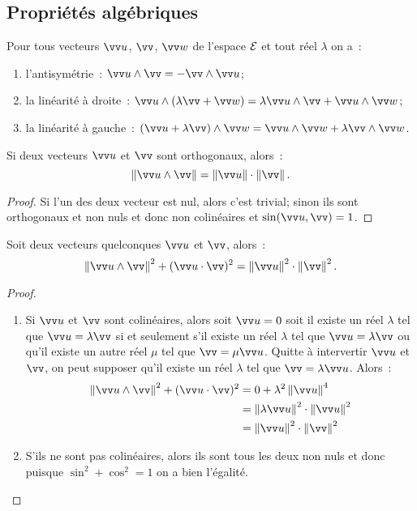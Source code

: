\subsection{Propriétés algébriques}
\begin{prop}
  Pour tous vecteurs $\vu$, $\vv$, $\vw$ de l'espace $\mathcal{E}$ et tout réel $\lambda$ on a~:
  \begin{enumerate}
  \item l'antisymétrie~: $\vu\wedge\vv=-\vv\wedge\vu$;
  \item la linéarité à droite~: $\vu\wedge(\lambda\vv+\vw)=\lambda\vu\wedge\vv+\vu\wedge\vw$;
  \item la linéarité à gauche~: $(\vu+\lambda\vv)\wedge\vw=\vu\wedge\vw+\lambda\vv\wedge\vw$.
  \end{enumerate}
\end{prop}
\begin{prop}
  Si deux vecteurs $\vu$ et $\vv$ sont orthogonaux, alors~:
\begin{equation}
  \norme{\vu\wedge\vv}=\norme{\vu}\cdot\norme{\vv}.
\end{equation}
\end{prop}
\begin{proof}
  Si l'un des deux vecteur est nul, alors c'est trivial; sinon ils sont orthogonaux et non nuls et donc non colinéaires et $\sin(\vu,\vv)=1$.
\end{proof}
\begin{prop}
  Soit deux vecteurs quelconques $\vu$ et $\vv$, alors~:
  \begin{equation}
    \norme{\vu\wedge\vv}^2+(\vu\cdot\vv)^2=\norme{\vu}^2\cdot\norme{\vv}^2.
  \end{equation}
\end{prop}
\begin{proof}
  \begin{enumerate}
  \item Si $\vu$ et $\vv$ sont colinéaires, alors soit $\vu=0$ soit il existe un réel $\lambda$ tel que $\vu=\lambda\vv$ si et seulement s'il existe  un réel $\lambda$ tel que $\vu=\lambda\vv$ ou qu'il existe un autre réel $\mu$ tel que $\vv=\mu\vu$. Quitte à intervertir $\vu$ et $\vv$, on peut supposer qu'il existe un réel $\lambda$ tel que $\vv=\lambda\vu$. Alors~:
    \begin{align}
      \norme{\vu\wedge\vv}^2+(\vu\cdot\vv)^2&=0+\lambda^2\norme{\vu}^4\\
      &=\norme{\lambda\vu}^2\cdot\norme{\vu}^2\\
      &=\norme{\vu}^2\cdot\norme{\vv}^2
    \end{align}
  \item S'ils ne sont pas colinéaires, alors ils sont tous les deux non nuls et donc puisque $\sin^2+\cos^2=1$ on a bien l'égalité.
  \end{enumerate}
\end{proof}
